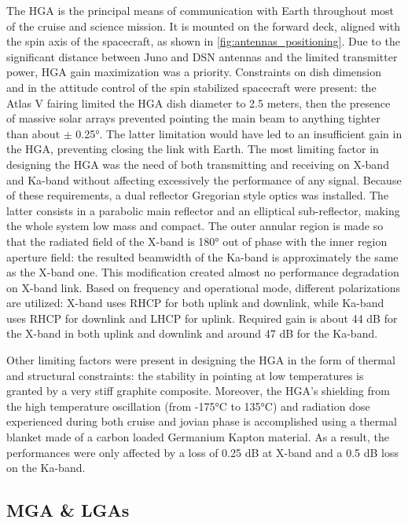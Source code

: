 The HGA\cite{juno_telecommunication}\cite{telecommunication_antennas} is the principal means of communication with Earth throughout most of the cruise and science mission. It is mounted on the forward deck, aligned with the spin axis of the spacecraft, as shown in \autoref{fig:antennas_positioning}. Due to the significant distance between Juno and DSN antennas and the limited transmitter power, HGA gain maximization was a priority. Constraints on dish dimension and in the attitude control of the spin stabilized spacecraft were present: the Atlas V fairing limited the HGA dish diameter to 2.5 meters, then the presence of massive solar arrays prevented pointing the main beam to anything tighter than about $\pm$ 0.25°. The latter limitation would have led to an insufficient gain in the HGA, preventing closing the link with Earth. The most limiting factor in designing the HGA was the need of both transmitting and receiving on X-band and Ka-band without affecting excessively the performance of any signal. Because of these requirements, a dual reflector Gregorian style optics was installed. The latter consists in a parabolic main reflector and an elliptical sub-reflector, making the whole system low mass and compact\cite{telecommunication_antennas}. The outer annular region is made so that the radiated field of the X-band is 180° out of phase with the inner region aperture field: the resulted beamwidth of the Ka-band is approximately the same as the X-band one. This modification created almost no performance degradation on X-band link. Based on frequency and operational mode, different polarizations are utilized: X-band uses RHCP for both uplink and downlink, while Ka-band uses RHCP for downlink and LHCP for uplink\cite{juno_telecommunication}. Required gain is about 44 dB for the X-band in both uplink and downlink and around 47 dB for the Ka-band.

Other limiting factors were present in designing the HGA in the form of thermal and structural constraints: the stability in pointing at low temperatures is granted by a very stiff graphite composite. Moreover, the HGA's shielding from the high temperature oscillation (from -175°C to 135°C) and radiation dose experienced during both cruise and jovian phase is accomplished using a thermal blanket made of a carbon loaded Germanium Kapton material\cite{telecommunication_antennas}\cite{germanio}. As a result, the performances were only affected by a loss of 0.25 dB at X-band and a 0.5 dB loss on the Ka-band. 

\subsection{MGA \& LGAs}
\label{subsec:mga e lga}

